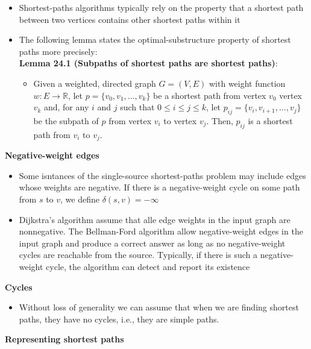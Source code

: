 \documentclass{report}
\begin{document}
\begin{itemize}
    \item Shortest-paths algorithms typically rely on the property that a shortest path between two vertices contains other shortest paths within it
    \item The following lemma states the optimal-substructure property of shortest paths more precisely: \\
    \textbf{Lemma 24.1 (Subpaths of shortest paths are shortest paths)}:
    \begin{itemize}
        \item Given a weighted, directed graph $G = (V, E)$ with weight function $w: E \rightarrow \mathbb{R}$, let $p = \{v_0, v_1, ..., v_k\}$ be a shortest path from vertex $v_0$ vertex $v_k$ and, for any $i$ and $j$ such that $0 \leq i \leq j \leq k$, let $p_{ij} = \{v_i, v_{i + 1}, ..., v_j\}$ be the subpath of $p$ from vertex $v_i$ to vertex $v_j$. Then, $p_{ij}$ is a shortest path from $v_i$ to $v_j$.
    \end{itemize}
\end{itemize}
\textbf{Negative-weight edges}
\begin{itemize}
    \item Some isntances of the single-source shortest-paths problem may include edges whose weights are negative. If there is a negative-weight cycle on some path from $s$ to $v$, we define $\delta(s, v) = -\infty$
    \item Dijkstra's algorithm assume that alle edge weights in the input graph are nonnegative. The Bellman-Ford algorithm allow negative-weight edges in the input graph and produce a correct answer as long as no negative-weight cycles are reachable from the source. Typically, if there is such a negative-weight cycle, the algorithm can detect and report its existence
\end{itemize}
\textbf{Cycles}
\begin{itemize}
    \item Without loss of generality we can assume that when we are finding shortest paths, they have no cycles, i.e., they are simple paths.
\end{itemize}
\textbf{Representing shortest paths}
\end{document}

